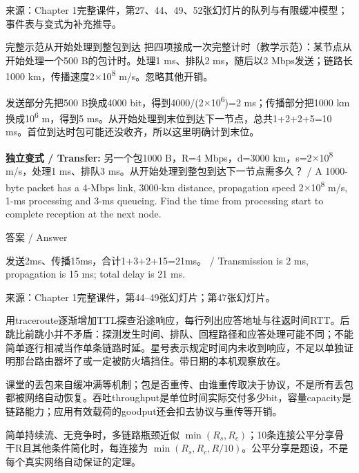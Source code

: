 来源：Chapter 1完整课件，第27、44、49、52张幻灯片的队列与有限缓冲模型；事件表与变式为补充推导。


\begin{StudyBlock}{完整示范}{从开始处理到整包到达}
把四项接成一次完整计时（教学示范）：某节点从开始处理一个500 B的包计时。处理1 ms、排队2 ms，随后以2 Mbps发送；链路长1000 km，传播速度2\ensuremath{\times}10\textsuperscript{8} m/s。忽略其他开销。


发送部分先把500 B换成4000 bit，得到4000/(2\ensuremath{\times}10\textsuperscript{6})=2 ms；传播部分把1000 km换成10\textsuperscript{6} m，得到5 ms。从开始处理到末位到达下一节点，总共1+2+2+5=10 ms。首位到达时包可能还没收齐，所以这里明确计到末位。
\end{StudyBlock}

\textbf{独立变式 / Transfer:} 另一个包1000 B，R=4 Mbps，d=3000 km，s=2\ensuremath{\times}10\textsuperscript{8} m/s，处理1 ms、排队3 ms。从开始处理到整包到达下一节点需多久？ / A 1000-byte packet has a 4-Mbps link, 3000-km distance, propagation speed 2\ensuremath{\times}10\textsuperscript{8} m/s, 1-ms processing and 3-ms queueing. Find the time from processing start to complete reception at the next node.



\begin{StudySolution}{答案 / Answer}


发送2ms、传播15ms，合计1+3+2+15=21ms。 / Transmission is 2 ms, propagation is 15 ms; total delay is 21 ms.


\end{StudySolution}


来源：Chapter 1完整课件，第44–49张幻灯片；第47张幻灯片。





用traceroute逐渐增加TTL探查沿途响应，每行列出应答地址与往返时间RTT。后跳比前跳小并不矛盾：探测发生时间、排队、回程路径和应答处理可能不同；不能简单逐行相减当作单条链路时延。星号表示规定时间内未收到响应，不足以单独证明那台路由器坏了或一定被防火墙挡住。带日期的本机观察放在。


课堂的丢包来自缓冲满等机制；包是否重传、由谁重传取决于协议，不是所有丢包都被网络自动恢复。吞吐throughput是单位时间实际交付多少bit，容量capacity是链路能力；应用有效载荷的goodput还会扣去协议与重传等开销。


简单持续流、无竞争时，多链路瓶颈近似 \(\min(R_s,R_c)\)；10条连接公平分享骨干R且其他条件简化时，每连接为 \(\min(R_s,R_c,R/10)\)。公平分享是题设，不是每个真实网络自动保证的定理。


